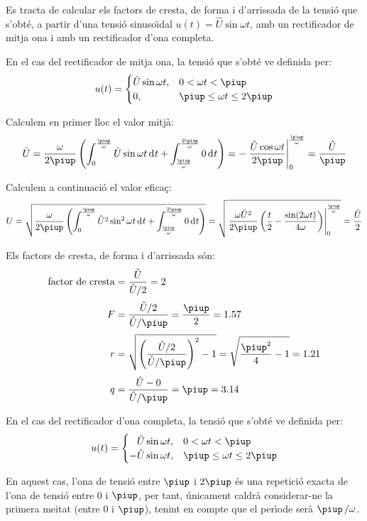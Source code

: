 \begin{exemple}
Es tracta de calcular els factors de cresta, de forma i d'arrissada
de la tensi\'{o}  que s'obt\'{e}, a partir d'una tensi\'{o} sinuso\"{\i}dal
$u(t) = \hat{U} \sin\omega t$, amb un rectificador de mitja ona i
amb un rectificador d'ona completa.

En el cas del rectificador de mitja ona, la tensi\'{o} que s'obt\'{e} ve
definida per:
\[
u(t) = \begin{cases} \hat{U} \sin\omega t, & 0 < \omega t < \piup\\
       0, & \piup \leq \omega t \leq 2\piup \end{cases}
\]

Calculem en primer lloc el valor mitj\`{a}:
\[
\bar{U} = \frac{\omega}{2\piup} \left( \int_0^\frac{\piup}{\omega}
\hat{U} \sin\omega t \diff t +
\int_\frac{\piup}{\omega}^\frac{2\piup}{\omega} 0 \diff t \right) = -
\left. \frac{\hat{U} \cos\omega t}{2\piup}
\right|_0^\frac{\piup}{\omega} = \frac{\hat{U}}{\piup}
\]

Calculem a continuaci\'{o} el valor efica\c{c}:
\[
U = \sqrt{\frac{\omega}{2\piup} \left( \int_0^\frac{\piup}{\omega}
\hat{U}^2 \sin^2\omega t \diff t +
\int_\frac{\piup}{\omega}^\frac{2\piup}{\omega} 0 \diff t \right)} =
  \sqrt{\left.\frac{\omega \hat{U}^2}{2\piup}\left( \frac{t}{2} -
\frac{\sin (2\omega t)}{4\omega}
\right)\right|_0^\frac{\piup}{\omega}} = \frac{\hat{U}}{2}
\]

Els factors de cresta, de forma i d'arrissada s\'{o}n:
\begin{align*}
    \text{factor de cresta} &= \frac{\hat{U}}{\hat{U}/2} = 2 \\[0.5ex]
    F &= \frac{\hat{U}/2}{\hat{U}/\piup} =\frac{\piup}{2} =
    \num{1,57} \\[0.5ex]
    r &= \sqrt{\left(\frac{\hat{U}/2}{\hat{U}/\piup}\right)^2-1} =
\sqrt{\frac{\piup^2}{4}-1} = \num{1,21} \\[0.5ex]
    q &= \frac{\hat{U} - 0}{\hat{U}/\piup} = \piup = \num{3,14}
\end{align*}


En el cas del rectificador d'ona completa, la tensi\'{o} que s'obt\'{e} ve
definida per:
\[
u(t) = \begin{cases} \phantom{-}\hat{U} \sin\omega t, & 0 < \omega t < \piup\\
       -\hat{U} \sin\omega t, & \piup \leq \omega t \leq 2\piup \end{cases}
\]

En aquest cas, l'ona de tensi\'{o} entre $\piup$ i $2\piup$ \'{e}s una repetici\'{o}
exacta de l'ona de tensi\'{o} entre 0 i $\piup$, per tant, \'{u}nicament
caldr\`{a} considerar-ne la primera meitat (entre 0 i $\piup$), tenint en
compte que el per\'{\i}ode ser\`{a} $\piup\,/\omega$.


\end{exemple}
